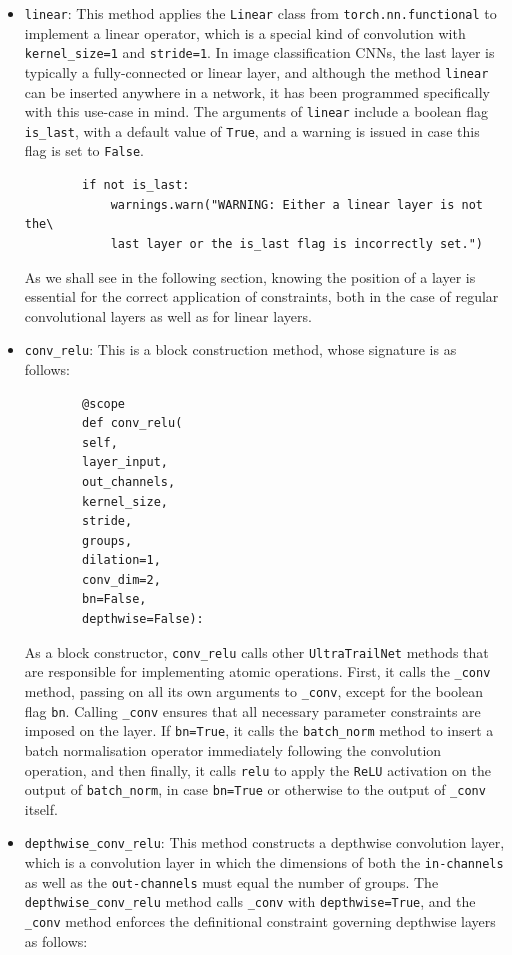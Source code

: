 \documentclass[11pt,a4paper, open=any]{scrbook}
\newcounter{constraint}[chapter]
\newcommand{\py}[1]{\texttt{#1}}
\begin{document}
\begin{itemize}[
	label={},
	parsep=0pt,
	partopsep=0pt,
	itemsep=16pt
	]
	
	\item \py{linear}: This method applies the \py{Linear} class from \py{torch.nn.functional} to implement a linear operator, which is a special kind of convolution with \py{kernel_size=1} and \py{stride=1}. In image classification CNNs, the last layer is typically a fully-connected or linear layer, and although the method \py{linear} can be inserted anywhere in a network, it has been programmed specifically with this use-case in mind. The arguments of \py{linear} include a boolean flag \py{is_last}, with a default value of \py{True}, and a warning is issued in case this flag is set to \py{False}.
	
	\begin{verbatim}
		if not is_last:
			warnings.warn("WARNING: Either a linear layer is not the\
			last layer or the is_last flag is incorrectly set.")
	\end{verbatim}
	
	As we shall see in the following section, knowing the position of a layer is essential for the correct application of constraints, both in the case of regular convolutional layers as well as for linear layers.
	
	\item \py{conv_relu}: This is a block construction method, whose signature is as follows:
	
	\begin{verbatim}
		@scope
		def conv_relu(
		self,
		layer_input,
		out_channels,
		kernel_size,
		stride,
		groups,
		dilation=1,
		conv_dim=2,
		bn=False,
		depthwise=False):
	\end{verbatim}
	
	As a block constructor, \py{conv_relu} calls other \py{UltraTrailNet} methods that are responsible for implementing atomic operations. First, it calls the \py{_conv} method, passing on all its own arguments to \py{_conv}, except for the boolean flag \py{bn}. Calling \py{_conv} ensures that all necessary parameter constraints are imposed on the layer. If \py{bn=True}, it calls the \py{batch_norm} method to insert a batch normalisation operator immediately following the convolution operation, and then finally, it calls \py{relu} to apply the \texttt{ReLU} activation on the output of \py{batch_norm}, in case \py{bn=True} or otherwise to the output of \py{_conv} itself.
	
		\item \py{depthwise_conv_relu}: This method constructs a depthwise convolution layer, which is a convolution layer in which the dimensions of both the \texttt{in-channels} as well as the \texttt{out-channels} must equal the number of groups. The \py{depthwise_conv_relu} method calls  \py{_conv} with \py{depthwise=True}, and the \py{_conv} method enforces the definitional constraint governing depthwise layers as follows: 
	

\end{itemize}
\end{document}
